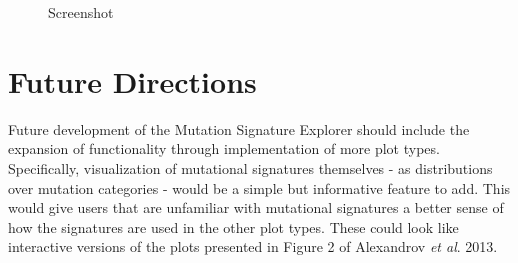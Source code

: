 \documentclass[12pt, letterpaper]{article}
\begin{document}
\begin{figure}
    \caption{Screenshot}
    \centering
\end{figure}

\section{Future Directions}
Future development of the Mutation Signature Explorer should include the expansion of functionality through implementation of more plot types.
Specifically, visualization of mutational signatures themselves - as distributions over mutation categories - would be a simple but informative feature to add.
This would give users that are unfamiliar with mutational signatures a better sense of how the signatures are used in the other plot types.
These could look like interactive versions of the plots presented in Figure 2 of Alexandrov \textit{et al}. 2013\cite{alexandrov2013signatures}.
\end{document}
